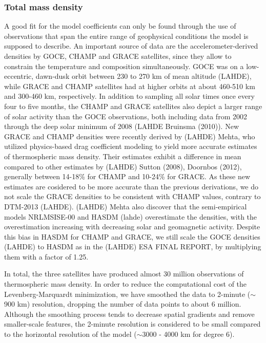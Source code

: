 \documentclass[referee,a4paper,12pt,traditabstract]{swsc}
\begin{document}
\begin{linenumbers}
\subsubsection{Total mass density}

A good fit for the model coefficients can only be found through the use of observations that span the entire range of geophysical conditions the model is supposed to describe. An important source of data are the accelerometer-derived densities by GOCE, CHAMP and GRACE satellites, since they allow to constrain the temperature and composition simultaneously. GOCE was on a low-eccentric, dawn-dusk orbit between 230 to 270 km of mean altitude (LAHDE), while GRACE and CHAMP satellites had at higher orbits at about 460-510 km and 300-460 km, respectively. In addition to sampling all solar times once every four to five months, the CHAMP and GRACE satellites also depict a larger range of solar activity than the GOCE observations, both including data from 2002 through the deep solar minimum of 2008 (LAHDE Bruinsma (2010)). New GRACE and CHAMP densities were recently derived by (LAHDE) Mehta, who utilized physics-based drag coefficient modeling to yield more accurate estimates of thermospheric mass density. Their estimates exhibit a difference in mean compared to other estimates by (LAHDE) Sutton (2008), Doornbos (2012), generally between 14-18\% for CHAMP and 10-24\% for GRACE. As these new estimates are cosidered to be more accurate than the previous derivations, we do not scale the GRACE densities to be consistent with CHAMP values, contrary to DTM-2013 (LAHDE). (LAHDE) Mehta also discover that the semi-empirical models NRLMSISE-00 and HASDM (lahde) overestimate the densities, with the overestimation increasing with decreasing solar and geomagnetic activity. Despite this bias in HASDM for CHAMP and GRACE, we still scale the GOCE densities (LAHDE) to HASDM as in the (LAHDE) ESA FINAL REPORT, by multiplying them with a factor of 1.25. 

In total, the three satellites have produced almost 30 million observations of thermospheric mass density. In order to reduce the computational cost of the Levenberg-Marquardt minimization, we have smoothed the data to 2-minute ($\sim$900 km) resolution, dropping the number of data points to about 6 million. Although the smoothing process tends to decrease spatial gradients and remove smaller-scale features, the 2-minute resolution is considered to be small compared to the horizontal resolution of the 
model ($\sim$3000 - 4000 km for degree 6). 


\end{linenumbers}
\end{document}
